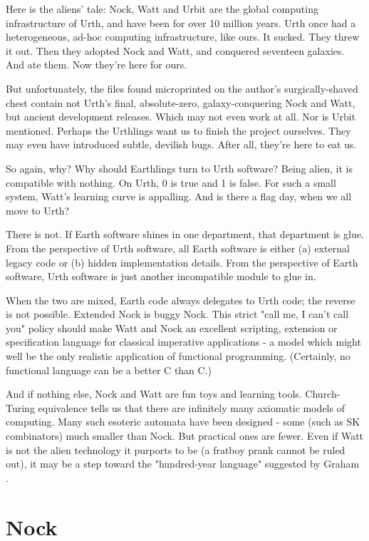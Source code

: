 \documentclass[10pt, nocopyrightspace]{sigplanconf}
\begin{document}
Here is the aliens' tale: Nock, Watt and Urbit are the global
computing infrastructure of Urth, and have been for over 10
million years.  Urth once had a heterogeneous, ad-hoc computing
infrastructure, like ours.  It sucked.  They threw it out.  Then
they adopted Nock and Watt, and conquered seventeen galaxies.
And ate them.  Now they're here for ours.

But unfortunately, the files found microprinted on the author's
surgically-shaved chest contain not Urth's final, absolute-zero,
galaxy-conquering Nock and Watt, but ancient development
releases.  Which may not even work at all.  Nor is Urbit
mentioned.  Perhaps the Urthlings want us to finish the project
ourselves.  They may even have introduced subtle, devilish bugs.
After all, they're here to eat us.

So again, why?  Why should Earthlings turn to Urth software?
Being alien, it is compatible with nothing.  On Urth, 0 is true
and 1 is false.  For such a small system, Watt's learning curve
is appalling.  And is there a flag day, when we all move to Urth?

There is not.  If Earth software shines in one department, that
department is glue.  From the perspective of Urth software, all
Earth software is either (a) external legacy code or (b) hidden
implementation details.  From the perspective of Earth software,
Urth software is just another incompatible module to glue in.

When the two are mixed, Earth code always delegates to Urth code;
the reverse is not possible.  Extended Nock is buggy Nock.  This 
strict "call me, I can't call you" policy should make Watt and
Nock an excellent scripting, extension or specification language
for classical imperative applications - a model which might well
be the only realistic application of functional programming.
(Certainly, no functional language can be a better C than C.)

And if nothing else, Nock and Watt are fun toys and learning
tools.  Church-Turing equivalence tells us that there are
infinitely many axiomatic models of computing.  Many such
esoteric automata have been designed - some (such as SK
combinators) much smaller than Nock.  But practical ones are
fewer.  Even if Watt is not the alien technology it purports to
be (a fratboy prank cannot be ruled out), it may be a step toward
the "hundred-year language" suggested by Graham
\citep{graham100yr}.

\section{Nock}
\end{document}
